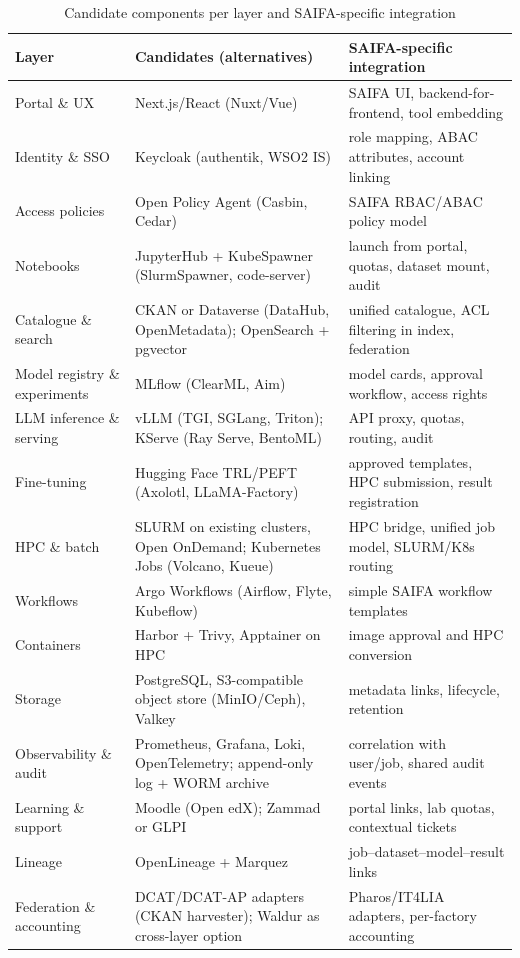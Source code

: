 \documentclass[conference,a4paper]{IEEEtran}
\begin{document}
\begin{table}[t]
\centering
\caption{Candidate components per layer and SAIFA-specific integration}
\label{tab:tools}
\footnotesize
\renewcommand{\arraystretch}{1.08}
\begin{tabular}{@{}p{3.0cm}p{7.2cm}p{6.6cm}@{}}
\toprule
\textbf{Layer} & \textbf{Candidates (alternatives)} & \textbf{SAIFA-specific integration} \\
\midrule
Portal \& UX & Next.js/React (Nuxt/Vue) & SAIFA UI, backend-for-frontend, tool embedding \\
Identity \& SSO & Keycloak (authentik, WSO2 IS) & role mapping, ABAC attributes, account linking \\
Access policies & Open Policy Agent (Casbin, Cedar) & SAIFA RBAC/ABAC policy model \\
Notebooks & JupyterHub + KubeSpawner (SlurmSpawner, code-server) & launch from portal, quotas, dataset mount, audit \\
Catalogue \& search & CKAN or Dataverse (DataHub, OpenMetadata); OpenSearch + pgvector & unified catalogue, ACL filtering in index, federation \\
Model registry \& experiments & MLflow (ClearML, Aim) & model cards, approval workflow, access rights \\
LLM inference \& serving & vLLM (TGI, SGLang, Triton); KServe (Ray Serve, BentoML) & API proxy, quotas, routing, audit \\
Fine-tuning & Hugging Face TRL/PEFT (Axolotl, LLaMA-Factory) & approved templates, HPC submission, result registration \\
HPC \& batch & SLURM on existing clusters, Open OnDemand; Kubernetes Jobs (Volcano, Kueue) & HPC bridge, unified job model, SLURM/K8s routing \\
Workflows & Argo Workflows (Airflow, Flyte, Kubeflow) & simple SAIFA workflow templates \\
Containers & Harbor + Trivy, Apptainer on HPC & image approval and HPC conversion \\
Storage & PostgreSQL, S3-compatible object store (MinIO/Ceph), Valkey & metadata links, lifecycle, retention \\
Observability \& audit & Prometheus, Grafana, Loki, OpenTelemetry; append-only log + WORM archive & correlation with user/job, shared audit events \\
Learning \& support & Moodle (Open edX); Zammad or GLPI & portal links, lab quotas, contextual tickets \\
Lineage & OpenLineage + Marquez & job--dataset--model--result links \\
Federation \& accounting & DCAT/DCAT-AP adapters (CKAN harvester); Waldur as cross-layer option & Pharos/IT4LIA adapters, per-factory accounting \\
\bottomrule
\end{tabular}
\end{table}
\end{document}
